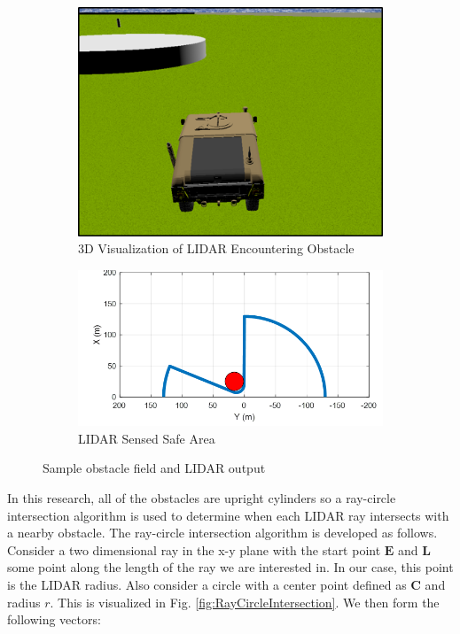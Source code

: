 \documentclass[12pt,onecolumn]{report}
\begin{document}
\begin{figure}[t]
	\centering
	\begin{subfigure}[t]{0.45\textwidth}
		\centering
		\includegraphics[width=\columnwidth]{Figs/incomingObst.png}
		\caption{{\small 3D Visualization of LIDAR Encountering Obstacle}}   
		\label{fig:obstacle_field_3D}
	\end{subfigure}
	\hfill
	\begin{subfigure}[t]{0.45\textwidth}
		\centering
		\includegraphics[width=\columnwidth]{Figs/obstLIDAR.png}
		\caption{\small LIDAR Sensed Safe Area}   
		\label{fig:obstacle_field_LIDAR}
	\end{subfigure}
	\caption{\small Sample obstacle field and LIDAR output}
	\label{fig:LIDARExample}
\end{figure}

In this research, all of the obstacles are upright cylinders so a ray-circle intersection algorithm is used to determine when each LIDAR ray intersects with a nearby obstacle. The ray-circle intersection algorithm is developed as follows. Consider a two dimensional ray in the x-y plane with the start point $\boldsymbol{E}$ and $\boldsymbol{L}$ some point along the length of the ray we are interested in. In our case, this point is the LIDAR radius. Also consider a circle with a center point defined as $\boldsymbol{C}$ and radius $r$. This is visualized in Fig. \ref{fig:RayCircleIntersection}. We then form the following vectors:
\end{document}
